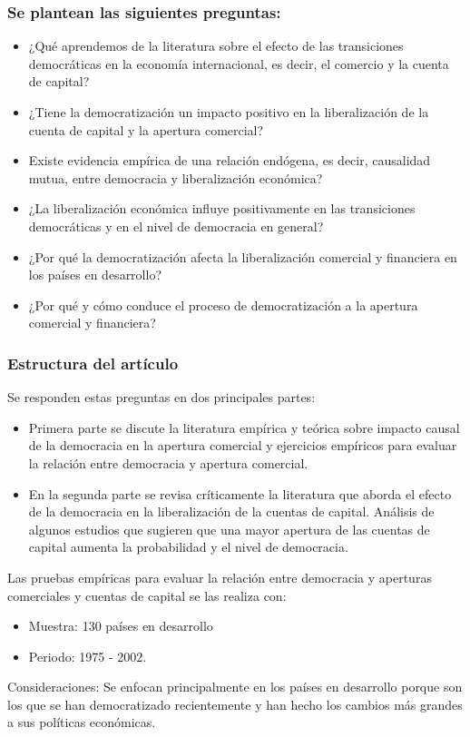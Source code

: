 \documentclass{beamer}
\begin{document}

\begin{frame}
\frametitle{Se plantean las siguientes preguntas:}
\begin{itemize}
\item ¿Qué aprendemos de la literatura sobre el efecto de las transiciones democráticas en la economía internacional, es decir, el comercio y la cuenta de capital?
\item ¿Tiene la democratización un impacto positivo en la liberalización de la cuenta de capital y la apertura comercial?
\item Existe evidencia empírica de una relación endógena, es decir, causalidad mutua, entre democracia y liberalización económica? 
\item ¿La liberalización económica influye positivamente en las transiciones democráticas y en el nivel de democracia en general?
\item ¿Por qué la democratización afecta la liberalización comercial y financiera en los países en desarrollo?
\item ¿Por qué y cómo conduce el proceso de democratización a la apertura comercial y financiera?
\end{itemize}
\end{frame}


\begin{frame}
\frametitle{Estructura del artículo}
Se responden estas preguntas en dos principales partes:
\begin{itemize}

\item Primera parte se discute la literatura empírica y teórica sobre impacto causal de la democracia en la apertura comercial y ejercicios empíricos para evaluar la relación entre democracia y apertura comercial.
\item En la segunda parte se revisa críticamente la literatura que aborda el efecto de la democracia en la liberalización de la cuentas de capital. 
Análisis de algunos estudios que sugieren que una mayor apertura de las cuentas de capital aumenta la probabilidad y el nivel de democracia. 

\end{itemize}
Las pruebas empíricas para evaluar la relación entre democracia y aperturas comerciales y cuentas de capital se las realiza con:
\begin{itemize}

\item Muestra: 130 países en desarrollo 
\item Periodo: 1975 - 2002.
\end{itemize}

Consideraciones: Se enfocan principalmente en los países en desarrollo porque son los que se han democratizado recientemente y han hecho los cambios más grandes a sus políticas económicas.

\end{frame}
\end{document}

